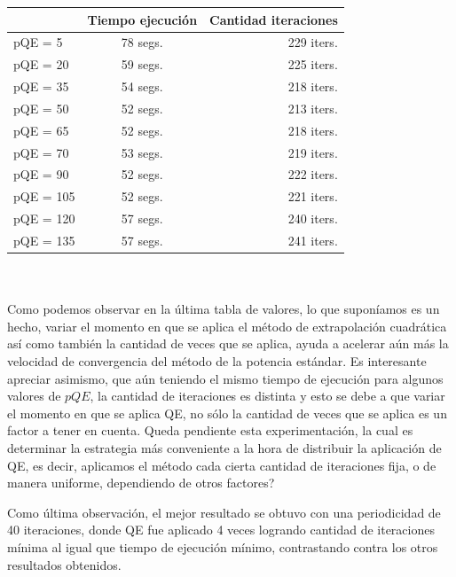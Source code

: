 \begin{tabular}{ l | c | r}
  & Tiempo ejecución & Cantidad iteraciones\\
  \hline
  pQE = 5 & 78 segs. & 229 iters.\\
  \hline
  pQE = 20 & 59 segs. & 225 iters.\\
  \hline
  pQE = 35 & 54 segs. & 218 iters. \\
  \hline
  pQE = 50 & 52 segs. & 213 iters. \\
  \hline
  pQE = 65 & 52 segs. & 218 iters. \\
  \hline
  pQE = 70 & 53 segs. & 219 iters. \\
  \hline
  pQE = 90 & 52 segs. & 222 iters. \\
  \hline
  pQE = 105 & 52 segs. & 221 iters. \\
  \hline
  pQE = 120 & 57 segs. & 240 iters. \\
  \hline
  pQE = 135 & 57 segs. & 241 iters. \\
  \hline
\end{tabular}
\\\\

Como podemos observar en la última tabla de valores, lo que suponíamos es un hecho, variar el momento en que se aplica el método de extrapolación cuadrática así como también la cantidad de veces que se aplica, ayuda a acelerar aún más la velocidad de convergencia del método de la potencia estándar. Es interesante apreciar asimismo, que aún teniendo el mismo tiempo de ejecución para algunos valores de $pQE$, la cantidad de iteraciones es distinta y esto se debe a que variar el momento en que se aplica QE, no sólo la cantidad de veces que se aplica es un factor a tener en cuenta. Queda pendiente esta experimentación, la cual es determinar la estrategia más conveniente a la hora de distribuir la aplicación de QE, es decir, aplicamos el método cada cierta cantidad de iteraciones fija, o de manera uniforme, dependiendo de otros factores?

Como última observación, el mejor resultado se obtuvo con una periodicidad de 40 iteraciones, donde QE fue aplicado 4 veces logrando cantidad de iteraciones mínima al igual que tiempo de ejecución mínimo, contrastando contra los otros resultados obtenidos.

